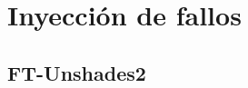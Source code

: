 \chapter{Inyección de fallos}
\label{ch:InyeccionDeFallos}

\lettrine[lraise=-0.1, lines=2, loversize=0.2]{}{}

\section{FT-Unshades2}
\label{sec:FT-Unshades2}


\endinput

